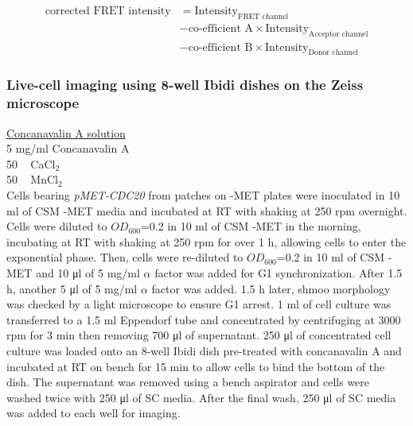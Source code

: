 \begin{align*}
    \text{corrected FRET intensity} &= \text{Intensity}_\text{FRET channel}\\& - \text{co-efficient A} \times \text{Intensity}_\text{Acceptor channel}\\& - \text{co-efficient B} \times \text{Intensity}_\text{Donor channel}
\end{align*}

\subsubsection{Live-cell imaging using 8-well Ibidi dishes on the Zeiss microscope}

\underline{Concanavalin A solution}\\
5 \si{\milli\gram/\milli\litre} Concanavalin A \\
50 \si{\milli\Molar} CaCl$_{2}$ \\
50 \si{\milli\Molar} MnCl$_{2}$ \\

Cells bearing \textit{pMET-CDC20} from patches on -MET plates were inoculated in 10 \si{\milli\litre} of CSM -MET media and incubated at RT with shaking at 250 rpm overnight. Cells were diluted to $OD_{600}$=0.2 in 10 \si{\milli\litre} of CSM -MET in the morning, incubating at RT with shaking at 250 rpm for over 1 \si{\hour}, allowing cells to enter the exponential phase. Then, cells were re-diluted to $OD_{600}$=0.2 in 10 \si{\milli\litre} of CSM -MET and 10 \si{\micro\litre} of 5 \si{\milli\gram/\milli\litre} $\alpha$ factor was added for G1 synchronization. After 1.5 \si{\hour}, another 5 \si{\micro\litre} of 5 \si{\milli\gram/\milli\litre} $\alpha$ factor was added. 1.5 \si{\hour} later, shmoo morphology was checked by a light microscope to ensure G1 arrest. 1 \si{\milli\litre} of cell culture was transferred to a 1.5 \si{\milli\litre} Eppendorf tube and concentrated by centrifuging at 3000 rpm for 3 \si{\minute} then removing 700 \si{\micro\litre} of supernatant. 250 \si{\micro\litre} of concentrated cell culture was loaded onto an 8-well Ibidi dish pre-treated with concanavalin A and incubated at RT on bench for 15 \si{\minute} to allow cells to bind the bottom of the dish. The supernatant was removed using a bench aspirator and cells were washed twice with 250 \si{\micro\litre} of SC media. After the final wash, 250 \si{\micro\litre} of SC media was added to each well for imaging. 

